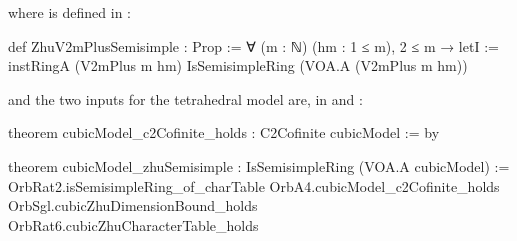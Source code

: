 \noindent where  is defined in :
\begin{leancode}
def ZhuV2mPlusSemisimple : Prop :=
  ∀ (m : ℕ) (hm : 1 ≤ m), 2 ≤ m →
    letI := instRingA (V2mPlus m hm)
    IsSemisimpleRing (VOA.A (V2mPlus m hm))
\end{leancode}
\noindent and the two inputs for the tetrahedral model are, in 
and :
\begin{leancode}
theorem cubicModel_c2Cofinite_holds : C2Cofinite cubicModel := by

theorem cubicModel_zhuSemisimple : IsSemisimpleRing (VOA.A cubicModel) :=
  OrbRat2.isSemisimpleRing_of_charTable OrbA4.cubicModel_c2Cofinite_holds
    OrbSgl.cubicZhuDimensionBound_holds OrbRat6.cubicZhuCharacterTable_holds
\end{leancode}

